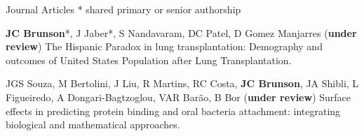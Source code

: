 \documentclass[10pt,a4paper]{article}
\begin{document}

\vspace{.25cm}
{\sc Journal Articles}\newline
* shared primary or senior authorship
\begin{enumerate}[label={[\arabic*]},labelindent=1cm,nolistsep]
\item
{\bfseries JC Brunson}*, J Jaber*, S Nandavaram, DC Patel, D Gomez Manjarres ({\bfseries under review}) The Hispanic Paradox in lung transplantation: Demography and outcomes of United States Population after Lung Transplantation.
\item
JGS Souza, M Bertolini, J Liu, R Martins, RC Costa, {\bfseries JC Brunson}, JA Shibli, L Figueiredo, A Dongari-Bagtzoglou, VAR Bar\~{a}o, B Bor ({\bfseries under review}) Surface effects in predicting protein binding and oral bacteria attachment: integrating biological and mathematical approaches.

\end{enumerate}
\end{document}
